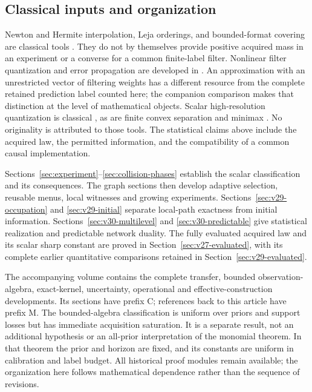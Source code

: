 \subsection{Classical inputs and organization}
Newton and Hermite interpolation, Leja orderings, and bounded-format
covering are classical tools
\cite{deBoor,Leja,BosEtAl,YomdinComte,ZhangKileel,ComteHalupczok}.
They do not by themselves provide positive acquired mass in an
experiment or a converse for a common finite-label filter. Nonlinear
filter quantization and error propagation are developed in
\cite{PagesPham2005,PagesSagna2018}. An approximation with an
unrestricted vector of filtering weights has a different resource
from the complete retained prediction label counted here; the companion
comparison makes that distinction at the level of mathematical objects.
Scalar high-resolution quantization is classical
\cite{GrafLuschgy2000}, as are finite convex separation and minimax
\cite{Rockafellar1964}. No originality is attributed to those tools.
The statistical claims above include the acquired law, the permitted
information, and the compatibility of a common causal implementation.

Sections~\ref{sec:experiment}--\ref{sec:collision-phases} establish
the scalar classification and its consequences. The graph sections
then develop adaptive selection, reusable menus, local witnesses and
growing experiments. Sections~\ref{sec:v29-occupation} and
\ref{sec:v29-initial} separate local-path exactness from initial
information. Sections~\ref{sec:v30-multilevel} and
\ref{sec:v30-predictable} give statistical realization and predictable
network duality. The fully evaluated acquired law and its scalar
sharp constant are proved in Section~\ref{sec:v27-evaluated}, with
its complete earlier quantitative comparisons retained in
Section~\ref{sec:v29-evaluated}.

The accompanying volume contains the complete transfer, bounded
observation-algebra, exact-kernel, uncertainty, operational and
effective-construction developments. Its sections have prefix C;
references back to this article have prefix M. The bounded-algebra
classification is uniform over priors and support losses but has
immediate acquisition saturation. It is a separate result, not an
additional hypothesis or an all-prior interpretation of the monomial
theorem. In that theorem the prior and horizon are fixed, and its
constants are uniform in calibration and label budget. All historical
proof modules remain available; the organization here follows
mathematical dependence rather than the sequence of revisions.
